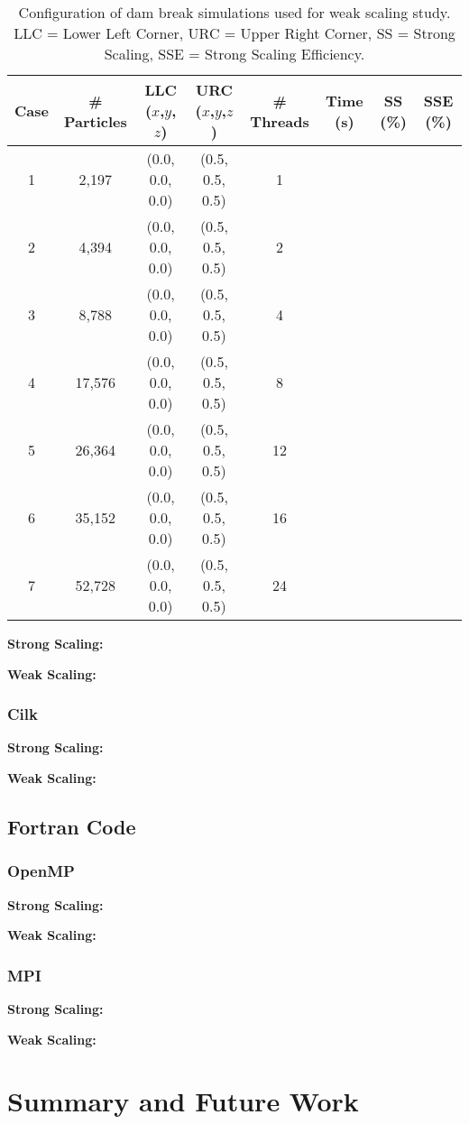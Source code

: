 \documentclass{scrartcl}
\begin{document}
    \begin{table}
    	\begin{tabular}{| c | c | c | c | c | c | c | c |}
    		\hline
    		Case & \# Particles & LLC ($x$,$y$,$z$) & URC ($x$,$y$,$z$) & \# Threads & Time (s) & SS (\%)& SSE (\%) \\ \hline
    		1 & 2,197 & (0.0, 0.0, 0.0) & (0.5, 0.5, 0.5) & 1 & & & \\ \hline		  		
    		2 & 4,394 & (0.0, 0.0, 0.0) & (0.5, 0.5, 0.5) & 2 & & & \\ \hline		  		
    		3 & 8,788 & (0.0, 0.0, 0.0) & (0.5, 0.5, 0.5) & 4 & & & \\ \hline		  		
    		4 & 17,576 & (0.0, 0.0, 0.0) & (0.5, 0.5, 0.5) & 8 & & & \\ \hline		  		
    		5 & 26,364 & (0.0, 0.0, 0.0) & (0.5, 0.5, 0.5) & 12 & & & \\ \hline		  		
    		6 & 35,152 & (0.0, 0.0, 0.0) & (0.5, 0.5, 0.5) & 16 & & & \\ \hline		  		
    		7 & 52,728 & (0.0, 0.0, 0.0) & (0.5, 0.5, 0.5) & 24 & & & \\ \hline		  		
    	\end{tabular}
    	\caption{Configuration of dam break simulations used for weak scaling study. LLC = Lower Left Corner, URC = Upper Right Corner, SS = Strong Scaling, SSE = Strong Scaling Efficiency.}
    	\label{tab:ws}
    \end{table}
  
    \textbf{Strong Scaling:}
    
    \textbf{Weak Scaling:}
    
  \subsubsection{Cilk}
  \textbf{Strong Scaling:}
  
  \textbf{Weak Scaling:}
  \subsection{Fortran Code}    
  
  \subsubsection{OpenMP}
  \textbf{Strong Scaling:}
  
  \textbf{Weak Scaling:}  
  
  \subsubsection{MPI}
  \textbf{Strong Scaling:}
  
  \textbf{Weak Scaling:}

	
  \section{Summary and Future Work}
\end{document}

